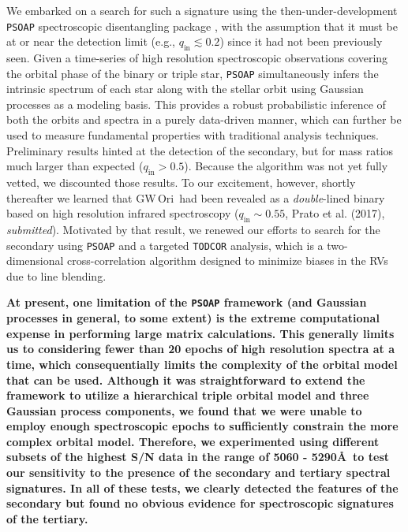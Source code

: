 \documentclass[twocolumn]{aastex61}
\newcommand{\obj}{GW\,Ori}
\begin{document}
We embarked on a search for such a  signature using the then-under-development \texttt{PSOAP} spectroscopic disentangling package \citep{czekala17}, with the assumption that it must be at or near the detection limit (e.g., $q_\mathrm{in} \lesssim 0.2$) since it had not been previously seen.
Given a time-series of high resolution spectroscopic observations covering the orbital phase of the binary or triple star, \texttt{PSOAP} simultaneously infers the intrinsic spectrum of each star along with the stellar orbit using Gaussian processes as a modeling basis. This provides a robust probabilistic inference of both the orbits and spectra in a purely data-driven manner, which can further be used to measure fundamental properties with traditional analysis techniques.
Preliminary results hinted at the detection of the secondary, but for mass ratios much larger than expected ($q_\mathrm{in} > 0.5$). Because the algorithm was not yet fully vetted, we discounted those results. To our excitement, however, shortly thereafter we learned that \obj\ had been revealed as a \emph{double}-lined binary based on high resolution infrared spectroscopy ($q_\mathrm{in} \sim 0.55$, Prato et al. (2017), \emph{submitted}). Motivated by that result, we renewed our efforts to search for the secondary using \texttt{PSOAP} and a targeted \texttt{TODCOR} analysis, which is a two-dimensional cross-correlation algorithm designed to minimize biases in the RVs due to line blending.

\textbf{At present, one limitation of the \texttt{PSOAP} framework (and Gaussian processes in general, to some extent) is the extreme computational expense in performing large matrix calculations. This generally limits us to considering fewer than 20 epochs of high resolution spectra at a time, which consequentially limits the complexity of the orbital model that can be used. Although it was straightforward to extend the framework to utilize a hierarchical triple orbital model and three Gaussian process components, we found that we were unable to employ enough spectroscopic epochs to sufficiently constrain the more complex orbital model. Therefore, we experimented using different subsets of the highest S/N data in the range of 5060 - 5290\AA\ to test our sensitivity to the presence of the secondary and tertiary spectral signatures. In all of these tests, we clearly detected the features of the secondary but found no obvious evidence for spectroscopic signatures of the tertiary.}
\end{document}
